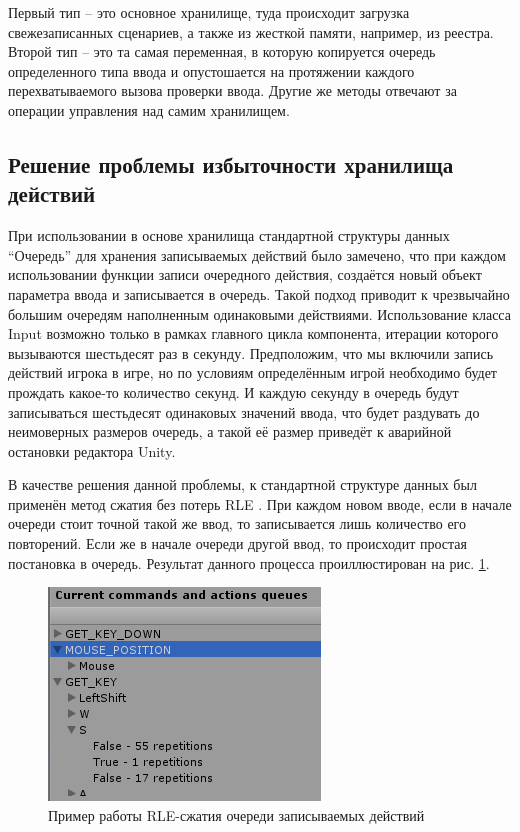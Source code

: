 Первый тип -- это основное хранилище, туда происходит загрузка свежезаписанных сценариев, а также из жесткой памяти, например, из реестра. Второй тип -- это та самая переменная, в которую копируется очередь определенного типа ввода и опустошается на протяжении каждого перехватываемого вызова проверки ввода. Другие же методы отвечают за операции управления над самим хранилищем.

\subsection{Решение проблемы избыточности хранилища действий}
При использовании в основе хранилища стандартной структуры данных ``Очередь'' для хранения записываемых действий было замечено, что при каждом использовании функции записи очередного действия, создаётся новый объект параметра ввода и записывается в очередь. Такой подход приводит к чрезвычайно большим очередям наполненным одинаковыми действиями. Использование класса Input возможно только в рамках главного цикла компонента, итерации которого вызываются шестьдесят раз в секунду. Предположим, что мы включили запись действий игрока в игре, но по условиям определённым игрой необходимо будет прождать какое-то количество секунд. И каждую секунду в очередь будут записываться шестьдесят одинаковых значений ввода, что будет раздувать до неимоверных размеров очередь, а такой её размер приведёт к аварийной остановки редактора Unity.

В качестве решения данной проблемы, к стандартной структуре данных был применён метод сжатия без потерь RLE \cite{rle}. При каждом новом вводе, если в начале очереди стоит точной такой же ввод, то записывается лишь количество его повторений. Если же в начале очереди другой ввод, то происходит простая постановка в очередь. Результат данного процесса проиллюстирован на рис. \ref{storageContains}.

\begin{figure}[h]
	\centering
	\includegraphics[width=0.5\linewidth]{storageContains.png}
	\caption{Пример работы RLE-сжатия очереди записываемых действий}
	\label{storageContains}
\end{figure}

